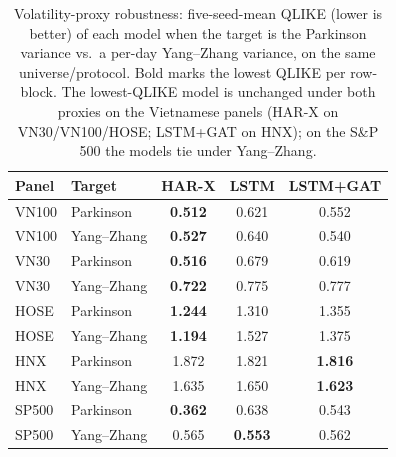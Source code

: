 \documentclass[runningheads]{llncs}
\begin{document}
\begin{table}[t]
\centering
\caption{Volatility-proxy robustness: five-seed-mean QLIKE (lower is better) of each model when the target is
the Parkinson variance vs.\ a per-day Yang--Zhang variance, on the same universe/protocol. Bold marks the
lowest QLIKE per row-block. The lowest-QLIKE model is unchanged under both proxies on the Vietnamese panels (HAR-X on VN30/VN100/HOSE; LSTM+GAT on HNX);
on the S\&P 500 the models tie under Yang--Zhang.}
\label{tab:proxy}
\footnotesize
\setlength{\tabcolsep}{6pt}
\begin{tabular}{llccc}
\toprule
Panel & Target & HAR-X & LSTM & LSTM+GAT \\
\midrule
VN100 & Parkinson & \textbf{0.512} & 0.621 & 0.552 \\
VN100 & Yang--Zhang & \textbf{0.527} & 0.640 & 0.540 \\
\midrule
VN30 & Parkinson & \textbf{0.516} & 0.679 & 0.619 \\
VN30 & Yang--Zhang & \textbf{0.722} & 0.775 & 0.777 \\
\midrule
HOSE & Parkinson & \textbf{1.244} & 1.310 & 1.355 \\
HOSE & Yang--Zhang & \textbf{1.194} & 1.527 & 1.375 \\
\midrule
HNX & Parkinson & 1.872 & 1.821 & \textbf{1.816} \\
HNX & Yang--Zhang & 1.635 & 1.650 & \textbf{1.623} \\
\midrule
SP500 & Parkinson & \textbf{0.362} & 0.638 & 0.543 \\
SP500 & Yang--Zhang & 0.565 & \textbf{0.553} & 0.562 \\
\bottomrule
\end{tabular}
\end{table}
\end{document}
